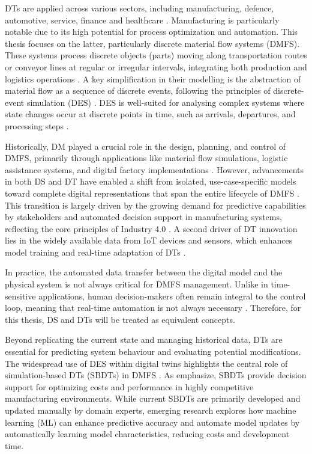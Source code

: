 DTs are applied across various sectors, including manufacturing, defence, automotive, service, finance and healthcare \autocite{Tao2018ijamt}. Manufacturing is particularly notable due to its high potential for process optimization and automation. This thesis focuses on the latter, particularly discrete material flow systems (DMFS). These systems process discrete objects (parts) moving along transportation routes or conveyor lines at regular or irregular intervals, integrating both production and logistics operations \autocite{arnold2005materialfluss, schwede2024learning}. A key simplification in their modelling is the abstraction of material flow as a sequence of discrete events, following the principles of discrete-event simulation (DES) \autocite{kovacs2016mathematical, robinson2014simulation}. DES is well-suited for analysing complex systems where state changes occur at discrete points in time, such as arrivals, departures, and processing steps \autocite{robinson2014simulation}.

Historically, DM played a crucial role in the design, planning, and control of DMFS, primarily through applications like material flow simulations, logistic assistance systems, and digital factory implementations \autocite{Thiede2013}. However, advancements in both DS and DT have enabled a shift from isolated, use-case-specific models toward complete digital representations that span the entire lifecycle of DMFS \autocite{Abdoune2023}. This transition is largely driven by the growing demand for predictive capabilities by stakeholders and automated decision support in manufacturing systems, reflecting the core principles of Industry 4.0 \autocite{frank2019industry}. A second driver of DT innovation lies in the widely available data from IoT devices and sensors, which enhances model training and real-time adaptation of DTs \autocite{Tao2018ijamt}.

In practice, the automated data transfer between the digital model and the physical system is not always critical for DMFS management. Unlike in time-sensitive applications, human decision-makers often remain integral to the control loop, meaning that real-time automation is not always necessary \autocite{schwede2024learning}. Therefore, for this thesis, DS and DTs will be treated as equivalent concepts.

Beyond replicating the current state and managing historical data, DTs are essential for predicting system behaviour and evaluating potential modifications. The widespread use of DES within digital twins highlights the central role of simulation-based DTs (SBDTs) in DMFS \autocite{Lugaresi2021aifac}. As \textcite{schwede2024learning} emphasize, SBDTs provide decision support for optimizing costs and performance in highly competitive manufacturing environments. While current SBDTs are primarily developed and updated manually by domain experts, emerging research explores how machine learning (ML) can enhance predictive accuracy and automate model updates by automatically learning model characteristics, reducing costs and development time.


